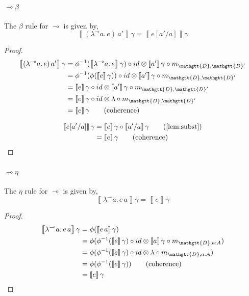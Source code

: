 \documentclass[acmsmall,nonacm]{acmart}
\renewcommand{\Delta}{\mathgtt{D}}
\newcommand{\sem}[1]{\left\llbracket{#1}\right\rrbracket}
\newcommand{\semg}[1]{\sem{#1}\gamma}
\newcommand{\lto}{\multimap}
\newcommand{\lamblto}[2]{\lambda^{{\lto}} #1.\, #2}
\newcommand{\applto}[2]{#1 \, #2}
\begin{document}
{\begin{center}
\end{center}

\paragraph{$\lto\beta$}
The $\beta$ rule for $\lto$ is given by,
\[
  \semg{\applto {(\lamblto {a} {e})} {a'}} = \semg{e[a'/a]}
\]
\begin{proof}
\begin{align*}
  \semg{\applto {(\lamblto {a} {e})} {a'}}
  & = \phi^{-1}(\semg{\lamblto {a} {e}}) \circ id \otimes \semg{a'} \circ m_{\Delta,\Delta'} \\
  & = \phi^{-1}(\phi(\semg{e})) \circ id \otimes \semg{a'} \circ m_{\Delta,\Delta'} \\
  & = \semg{e} \circ id \otimes \semg{a'} \circ m_{\Delta,\Delta'} \\
  & = \semg{e} \circ id \otimes \lambda \circ m_{\Delta,\Delta'} \\
  & = \semg{e} \tag{coherence}
\end{align*}

\begin{align*}
  \semg{e[a'/a]}
  & = \semg{e} \circ \semg{a'/a} \tag{\cref{lem:subst}} \\
  & = \semg{e} \tag{coherence}
\end{align*}
\end{proof}

\paragraph{$\lto\eta$}
The $\eta$ rule for $\lto$ is given by,
\[
  \semg{\lamblto {a} {\applto e a}} = \semg{e}
\]
\begin{proof}
\begin{align*}
  \semg{\lamblto {a} {\applto e a}}
  & = \phi(\semg{\applto e a}) \\
  & = \phi(\phi^{-1}(\semg{e}) \circ id \otimes \semg{a} \circ m_{\Delta,a:A}) \\
  & = \phi(\phi^{-1}(\semg{e}) \circ id \otimes \lambda \circ m_{\Delta,a:A}) \\
  & = \phi(\phi^{-1}(\semg{e})) \tag{coherence} \\
  & = \semg{e}
\end{align*}
\end{proof}


}
\end{document}
